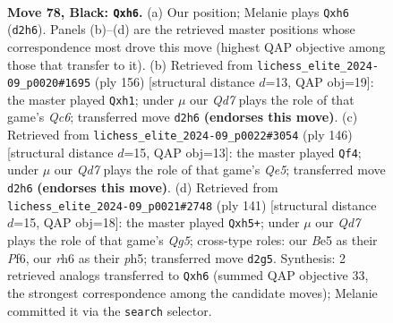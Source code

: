 \documentclass[11pt]{article}
\begin{document}
\clearpage

\begin{figure}[p]\centering
\begin{subfigure}{0.46\textwidth}\centering
\resizebox{\linewidth}{!}{%
\newchessgame
\chessboard[
  setfen={8/8/7R/4b3/8/1p1k1B2/3q4/6K1 b - - 13 78},
  showmover=false,
  pgfstyle=straightmove, color=movearrow, markmove={d2-h6}
]}
\caption{}
\end{subfigure}\hfill
\begin{subfigure}{0.46\textwidth}\centering
\resizebox{\linewidth}{!}{%
\newchessgame
\chessboard[
  setfen={8/3K4/2Q5/k7/8/8/8/7r w - - 43 79},
  showmover=false,
  pgfstyle=straightmove, color=movearrow, markmove={c6-h1}
]}
\caption{}
\end{subfigure}
\\[4pt]
\begin{subfigure}{0.46\textwidth}\centering
\resizebox{\linewidth}{!}{%
\newchessgame
\chessboard[
  setfen={3k4/2r5/8/3KQ3/8/8/8/8 w - - 25 74},
  showmover=false,
  pgfstyle=straightmove, color=movearrow, markmove={e5-f4}
]}
\caption{}
\end{subfigure}\hfill
\begin{subfigure}{0.46\textwidth}\centering
\resizebox{\linewidth}{!}{%
\newchessgame
\chessboard[
  setfen={8/5K2/5p2/7P/6q1/7k/8/8 b - - 4 71},
  showmover=false,
  pgfstyle=straightmove, color=movearrow, markmove={g4-h5}
]}
\caption{}
\end{subfigure}
\caption{\textbf{Move 78, Black: \texttt{Qxh6}.} (a) Our position; Melanie plays \texttt{Qxh6} (\texttt{d2h6}). Panels (b)--(d) are the retrieved master positions whose correspondence most drove this move (highest QAP objective among those that transfer to it). (b) Retrieved from \texttt{lichess\_elite\_2024-09\_p0020\#1695} (ply 156) [structural distance $d$=13, QAP obj=19]: the master played \texttt{Qxh1}; under $\mu$ our \emph{Qd7} plays the role of that game's \emph{Qc6}; transferred move \texttt{d2h6} \textbf{(endorses this move)}. (c) Retrieved from \texttt{lichess\_elite\_2024-09\_p0022\#3054} (ply 146) [structural distance $d$=15, QAP obj=13]: the master played \texttt{Qf4}; under $\mu$ our \emph{Qd7} plays the role of that game's \emph{Qe5}; transferred move \texttt{d2h6} \textbf{(endorses this move)}. (d) Retrieved from \texttt{lichess\_elite\_2024-09\_p0021\#2748} (ply 141) [structural distance $d$=15, QAP obj=18]: the master played \texttt{Qxh5+}; under $\mu$ our \emph{Qd7} plays the role of that game's \emph{Qg5}; cross-type roles: our \emph{B}e5 as their \emph{P}f6, our \emph{r}h6 as their \emph{p}h5; transferred move \texttt{d2g5}. Synthesis: 2 retrieved analogs transferred to \texttt{Qxh6} (summed QAP objective 33, the strongest correspondence among the candidate moves); Melanie committed it via the \texttt{search} selector.}
\label{fig:thought-m155}
\end{figure}
\end{document}
